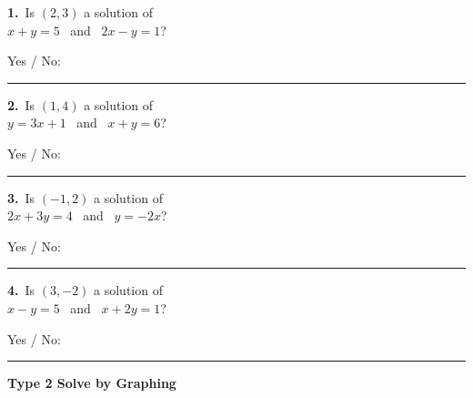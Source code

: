\documentclass[11pt,letterpaper]{article}
\newcommand{\topicbar}[1]{\needspace{4.5cm}\par\vspace{5mm}
  \begin{tcolorbox}[enhanced,colback=fmtitle,colframe=fmtitle,arc=2mm,left=4mm,top=1.5mm,bottom=1.5mm]
  \color{white}\bfseries\large #1
  \end{tcolorbox}}
\begin{document}
\needspace{3.3cm}\par\vspace{3mm}\noindent \begin{minipage}[t][2.8cm]{0.48\linewidth}\raggedright{\color{fmturn}\bfseries 1.}\ Is $(2, 3)$ a solution of \\ $x + y = 5$ \ and \ $2x - y = 1$?\par\vfill\hfill Yes / No:\ \rule{3.2cm}{0.4pt}\end{minipage}\hfill \begin{minipage}[t][2.8cm]{0.48\linewidth}\raggedright{\color{fmturn}\bfseries 2.}\ Is $(1, 4)$ a solution of \\ $y = 3x + 1$ \ and \ $x + y = 6$?\par\vfill\hfill Yes / No:\ \rule{3.2cm}{0.4pt}\end{minipage}\par
\needspace{3.3cm}\par\vspace{3mm}\noindent \begin{minipage}[t][2.8cm]{0.48\linewidth}\raggedright{\color{fmturn}\bfseries 3.}\ Is $(-1, 2)$ a solution of \\ $2x + 3y = 4$ \ and \ $y = -2x$?\par\vfill\hfill Yes / No:\ \rule{3.2cm}{0.4pt}\end{minipage}\hfill \begin{minipage}[t][2.8cm]{0.48\linewidth}\raggedright{\color{fmturn}\bfseries 4.}\ Is $(3, -2)$ a solution of \\ $x - y = 5$ \ and \ $x + 2y = 1$?\par\vfill\hfill Yes / No:\ \rule{3.2cm}{0.4pt}\end{minipage}\par
\needspace{9cm}\topicbar{Type 2 \quad Solve by Graphing}
\end{document}
